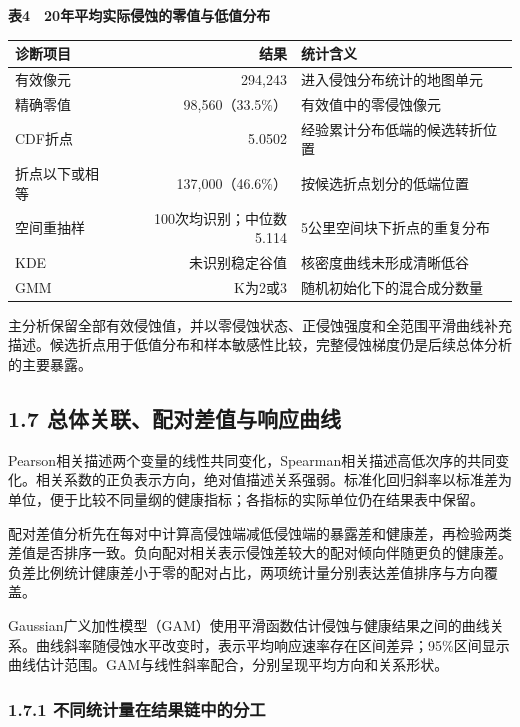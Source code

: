 \documentclass[
  11pt,
  a4paper,
]{ctexart}
\begin{document}
\textbf{表4　20年平均实际侵蚀的零值与低值分布}

\begin{longtable}[]{@{}lrl@{}}
\toprule
诊断项目 & 结果 & 统计含义 \\
\midrule
\endhead
有效像元 & 294,243 & 进入侵蚀分布统计的地图单元 \\
精确零值 & 98,560（33.5\%） & 有效值中的零侵蚀像元 \\
CDF折点 & 5.0502 & 经验累计分布低端的候选转折位置 \\
折点以下或相等 & 137,000（46.6\%） & 按候选折点划分的低端位置 \\
空间重抽样 & 100次均识别；中位数5.114 & 5公里空间块下折点的重复分布 \\
KDE & 未识别稳定谷值 & 核密度曲线未形成清晰低谷 \\
GMM & K为2或3 & 随机初始化下的混合成分数量 \\
\bottomrule
\end{longtable}

主分析保留全部有效侵蚀值，并以零侵蚀状态、正侵蚀强度和全范围平滑曲线补充描述。候选折点用于低值分布和样本敏感性比较，完整侵蚀梯度仍是后续总体分析的主要暴露。

\hypertarget{ux603bux4f53ux5173ux8054ux914dux5bf9ux5deeux503cux4e0eux54cdux5e94ux66f2ux7ebf}{%
\subsection{1.7
总体关联、配对差值与响应曲线}\label{ux603bux4f53ux5173ux8054ux914dux5bf9ux5deeux503cux4e0eux54cdux5e94ux66f2ux7ebf}}

Pearson相关描述两个变量的线性共同变化，Spearman相关描述高低次序的共同变化。相关系数的正负表示方向，绝对值描述关系强弱。标准化回归斜率以标准差为单位，便于比较不同量纲的健康指标；各指标的实际单位仍在结果表中保留。

配对差值分析先在每对中计算高侵蚀端减低侵蚀端的暴露差和健康差，再检验两类差值是否排序一致。负向配对相关表示侵蚀差较大的配对倾向伴随更负的健康差。负差比例统计健康差小于零的配对占比，两项统计量分别表达差值排序与方向覆盖。

Gaussian广义加性模型（GAM）使用平滑函数估计侵蚀与健康结果之间的曲线关系。曲线斜率随侵蚀水平改变时，表示平均响应速率存在区间差异；95\%区间显示曲线估计范围。GAM与线性斜率配合，分别呈现平均方向和关系形状。

\hypertarget{ux4e0dux540cux7edfux8ba1ux91cfux5728ux7ed3ux679cux94feux4e2dux7684ux5206ux5de5}{%
\subsubsection{1.7.1
不同统计量在结果链中的分工}\label{ux4e0dux540cux7edfux8ba1ux91cfux5728ux7ed3ux679cux94feux4e2dux7684ux5206ux5de5}}
\end{document}
